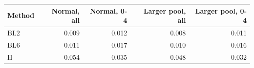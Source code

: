 \begin{tabular}{lrrrr}
\toprule
Method & Normal, all & Normal, 0-4 & Larger pool, all & Larger pool, 0-4 \\
\midrule
BL2 & 0.009 & 0.012 & 0.008 & 0.011 \\
BL6 & 0.011 & 0.017 & 0.010 & 0.016 \\
H & 0.054 & 0.035 & 0.048 & 0.032 \\
\bottomrule
\end{tabular}
